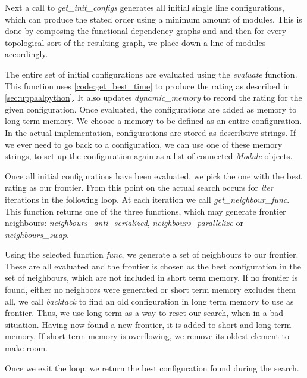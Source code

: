 Next a call to \textit{get\_init\_configs} generates all initial single line configurations, which can produce the stated order using a minimum amount of modules. This is done by composing the functional dependency graphs and and then for every topological sort of the resulting graph, we place down a line of modules accordingly. 

The entire set of initial configurations are evaluated using the \textit{evaluate} function. This function uses  \cref{code:get_best_time} to produce the rating as described in \cref{sec:uppaalpython}. It also updates \textit{dynamic\_memory} to record the rating for the given configuration. Once evaluated, the configurations are added as memory to long term memory. We choose a memory to be defined as an entire configuration. In the actual implementation, configurations are stored as describtive strings. If we ever need to go back to a configuration, we can use one of these memory strings, to set up the configuration again as a list of connected \textit{Module} objects.

Once all initial configurations have been evaluated, we pick the one with the best rating as our frontier. From this point on the actual search occurs for \textit{iter} iterations in the following loop. At each iteration we call \textit{get\_neighbour\_func}. This function returns one of the three functions, which may generate frontier neighbours: \textit{neighbours\_anti\_serialized}, \textit{neighbours\_parallelize} or \textit{neighbours\_swap}.

Using the selected function \textit{func}, we generate a set of neighbours to our frontier. These are all evaluated and the frontier is chosen as the best configuration in the set of neighbours, which are not included in short term memory. If no frontier is found, either no neighbors were generated or short term memory excludes them all, we call \textit{backtack} to find an old configuration in long term memory to use as frontier. Thus, we use long term as a way to reset our search, when in a bad situation. Having now found a new frontier, it is added to short and long term memory. If short term memory is overflowing, we remove its oldest element to make room. 

Once we exit the loop, we return the best configuration found during the search. 
